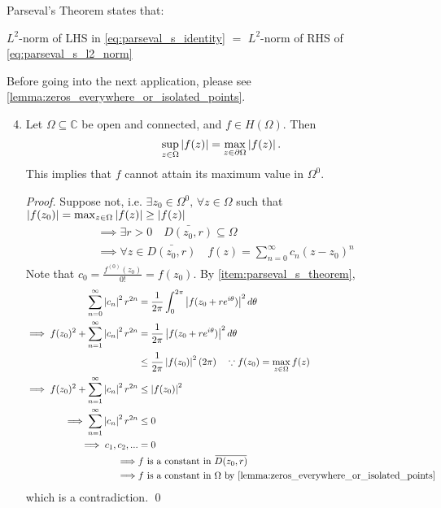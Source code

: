 \documentclass[11pt, oneside]{book}
\begin{document}
\begin{ex}
\begin{enumerate}
			Parseval's Theorem states that:

			$L^2$-norm of LHS in \cref{eq:parseval_s_identity} $=$ $L^2$-norm of RHS of \cref{eq:parseval_s_l2_norm}
	\end{enumerate}

	Before going into the next application, please see \cref{lemma:zeros_everywhere_or_isolated_points}.

	\begin{enumerate}
		\setcounter{enumi}{3}
		\item {} Let $\Omega \subseteq \mathbb{C}$ be open and connected, and $f \in H(\Omega)$. Then \label{item:maximum_modulus_principle}
		\begin{equation*}
			\sup_{z \in \Omega} \left|f(z)\right| = \max_{z \in \partial \Omega} \left|f(z)\right|.
		\end{equation*}
		This implies that $f$ cannot attain its maximum value in $\Omega^0$.

			\begin{proof}
				Suppose not, i.e. $\exists z_0 \in \Omega^0, \, \forall z \in \Omega$ such that $\left|f(z_0)\right| = \max_{z \in \Omega} \left|f(z)\right| \geq \left|f(z)\right|$
				\begin{align*}
					&\implies \exists r > 0 \quad \bar{D(z_0, r)} \subseteq \Omega \\
					&\implies \forall z \in \bar{D(z_0, r)} \quad f(z) = \sum_{n=0}^{\infty} c_n (z - z_0)^n
				\end{align*}
				Note that $c_0 = \frac{f^{(0)}(z_0)}{0!} = f(z_0)$. By \cref{item:parseval_s_theorem},
				\begin{align*}
					\sum_{n=0}^{\infty} \abs{c_n}^2 r^{2n} &= \frac{1}{2\pi} \int_{0}^{2 \pi} \abs{f(z_0 + re^{i \theta})}^2 \dif{\theta} \\
					\implies  f(z_0)^2 + \sum_{n=1}^{\infty} \abs{c_n}^2 r^{2n} & = \frac{1}{2 \pi} \abs{f(z_0 + re^{i \theta})}^2 \dif{\theta} \\
					& \leq \frac{1}{2 \pi} \abs{f(z_0)}^2 (2 \pi) \quad \because f(z_0) = \max_{z \in \Omega} f(z) \\
					\implies  f(z_0)^2 + \sum_{n=1}^{\infty} \abs{c_n}^2 r^{2n} & \leq \abs{f(z_0)}^2 \\
					\implies  \sum_{n=1}^{\infty} \abs{c_n}^2 r^{2n} & \leq 0 \\
					\implies c_1, c_2, ... & = 0 \\
					\implies & f \text{ is a constant in } \bar{D(z_0, r)} \\
					\implies & f \text{ is a constant in } \Omega \text{ by } \cref{lemma:zeros_everywhere_or_isolated_points}
				\end{align*}
				which is a contradiction. \qed
			\end{proof}
	\end{enumerate}

\end{ex}
\end{document}
